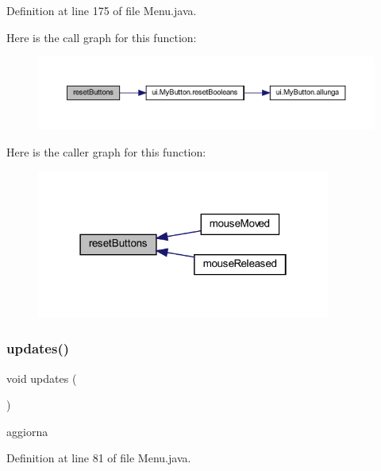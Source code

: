 Definition at line 175 of file Menu.\+java.

Here is the call graph for this function\+:\nopagebreak
\begin{figure}[H]
\begin{center}
\leavevmode
\includegraphics[width=350pt]{classscenes_1_1_menu_a548cf4795e9d559d0c0cce0bb57a5251_cgraph}
\end{center}
\end{figure}
Here is the caller graph for this function\+:\nopagebreak
\begin{figure}[H]
\begin{center}
\leavevmode
\includegraphics[width=274pt]{classscenes_1_1_menu_a548cf4795e9d559d0c0cce0bb57a5251_icgraph}
\end{center}
\end{figure}
\mbox{\label{classscenes_1_1_menu_a79c40c8c02ea1005b787c02252e57172}} 
\subsubsection{\texorpdfstring{updates()}{updates()}}
{\footnotesize\ttfamily void updates (\begin{DoxyParamCaption}{ }\end{DoxyParamCaption})}



aggiorna 



Definition at line 81 of file Menu.\+java.



